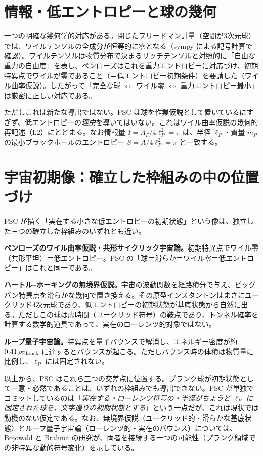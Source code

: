 \documentclass[11pt,a4paper]{article}
\newcommand{\eP}{\ell_P}
\begin{document}
\section{情報・低エントロピーと球の幾何}
一つの明確な幾何学的対応がある。閉じたフリードマン計量（空間が3次元球）では、ワイルテンソルの全成分が恒等的に零となる（sympy による記号計算で確認）。ワイルテンソルは物質分布で決まるリッチテンソルと対照的に「自由な重力の自由度」を表し、ペンローズはこれを重力エントロピーに対応づけ、初期特異点でワイルが零であること（＝低エントロピー初期条件）を要請した（ワイル曲率仮説）。したがって「完全な球 $\Leftrightarrow$ ワイル零 $\Leftrightarrow$ 重力エントロピー最小」は厳密に正しい対応である。

ただしこれは新たな導出ではない。PSC は球を作業仮説として置いているにすぎず、低エントロピーの\emph{理由}を導いてはいない。これはワイル曲率仮説の幾何的再記述（L2）にとどまる。なお情報量 $I=A_P/4\eP^2=\pi$ は、半径 $\eP$・質量 $m_P$ の最小ブラックホールのエントロピー $S=A/4\eP^2=\pi$ と一致する。

\section{宇宙初期像：確立した枠組みの中の位置づけ}
PSC が描く「実在する小さな低エントロピーの初期状態」という像は、独立した三つの確立した枠組みのいずれとも近い。

\textbf{ペンローズのワイル曲率仮説・共形サイクリック宇宙論。}初期特異点でワイル零（共形平坦）＝低エントロピー。PSC の「球＝滑らか＝ワイル零＝低エントロピー」はこれと同一である。

\textbf{ハートル–ホーキングの無境界仮説。}宇宙の波動関数を経路積分で与え、ビッグバン特異点を滑らかな幾何で置き換える。その原型インスタントンはまさにユークリッド4次元球であり、低エントロピーの初期状態が基底状態から自然に出る。ただしこの球は虚時間（ユークリッド符号）の鞍点であり、トンネル確率を計算する数学的道具であって、実在のローレンツ的対象ではない。

\textbf{ループ量子宇宙論。}特異点を量子バウンスで解消し、エネルギー密度が約 $0.41\,\rho_{\rm Planck}$ に達するとバウンスが起こる。ただしバウンス時の体積は物質量に比例し、$\eP$ には固定されない。

以上から、PSC はこれら三つの交差点に位置する。プランク球が初期状態として一意・必然であることは、いずれの枠組みでも導出できない。PSC が単独でコミットしているのは「\emph{実在する・ローレンツ符号の・半径がちょうど $\eP$ に固定された球を、文字通りの初期状態とする}」という一点だが、これは現状では動機のない仮定である。なお、無境界仮説（ユークリッド的・滑らかな基底状態）とループ量子宇宙論（ローレンツ的・実在のバウンス）については、Bojowald と Brahma の研究が、両者を接続する一つの可能性（プランク領域での非特異な動的符号変化）を示している。
\end{document}
